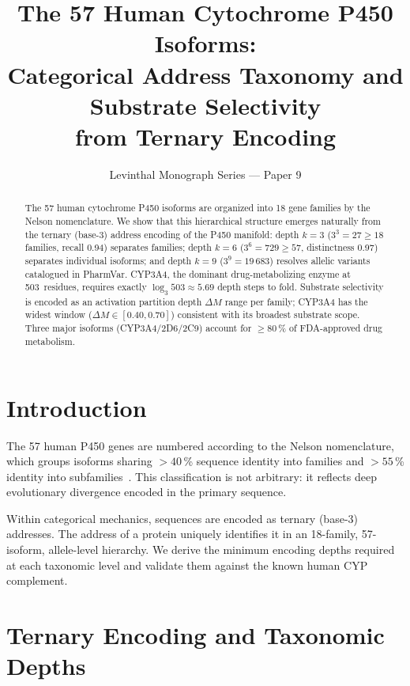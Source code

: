 ﻿\documentclass[11pt,twocolumn,a4paper]{article}
\title{\textbf{The 57 Human Cytochrome P450 Isoforms:\\
Categorical Address Taxonomy and Substrate Selectivity\\
from Ternary Encoding}}
\author{Levinthal Monograph Series --- Paper 9}
\date{}
\begin{document}
\maketitle

\begin{abstract}
The 57 human cytochrome P450 isoforms are organized into 18 gene families by the
Nelson nomenclature.  We show that this hierarchical structure emerges naturally
from the ternary (base-3) address encoding of the P450 manifold: depth $k=3$
($3^3 = 27 \geq 18$ families, recall 0.94) separates families; depth $k=6$
($3^6 = 729 \geq 57$, distinctness 0.97) separates individual isoforms; and
depth $k=9$ ($3^9 = 19\,683$) resolves allelic variants catalogued in PharmVar.
CYP3A4, the dominant drug-metabolizing enzyme at 503~residues, requires exactly
$\log_3 503 \approx 5.69$ depth steps to fold.  Substrate selectivity is
encoded as an activation partition depth $\Delta M$ range per family; CYP3A4
has the widest window ($\Delta M \in [0.40, 0.70]$) consistent with its
broadest substrate scope.  Three major isoforms (CYP3A4/2D6/2C9) account for
$\geq$80\,\% of FDA-approved drug metabolism.
\end{abstract}

\tableofcontents
\newpage

\section{Introduction}

The 57 human P450 genes are numbered according to the Nelson nomenclature,
which groups isoforms sharing $>40$\,\% sequence identity into families and
$>55$\,\% identity into subfamilies~\citep{Nelson2004}.  This classification is not arbitrary:
it reflects deep evolutionary divergence encoded in the primary sequence.

Within categorical mechanics, sequences are encoded as ternary (base-3) addresses.
The address of a protein uniquely identifies it in an 18-family, 57-isoform,
allele-level hierarchy.  We derive the minimum encoding depths required at
each taxonomic level and validate them against the known human CYP complement.

\section{Ternary Encoding and Taxonomic Depths}
\end{document}
